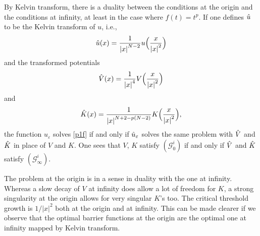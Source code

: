 \documentclass[a4paper]{amsart}
\begin{document}
By Kelvin transform, there is a duality between the conditions at the origin and the conditions at infinity, at least in the case where $f(t)=t^p$. If one defines $\Hat{u}$ to be the Kelvin transform of $u$, i.e., 
\[
 \Hat{u}(x)=\frac{1}{{\left| {x} \right|}^{N-2}} u\Bigl(\frac{x}{{\left| {x} \right|}^2} \Bigr)
\]
and the transformed potentials
\begin{align*}
 \Hat{V}(x)=\frac{1}{{\left| {x} \right|}^4}V\Bigl(\frac{x}{{\left| {x} \right|}^2} \Bigr)
\end{align*}
and
\begin{align*}
 \Hat{K}(x)=\frac{1}{{\left| {x} \right|}^{N+2-p(N-2)}}K\Bigl(\frac{x}{{\left| {x} \right|}^2} \Bigr),
\end{align*}
the function $u_\varepsilon$ solves \eqref{p1f} if and only if $\Hat{u}_\varepsilon$ solves the same problem with $\Hat{V}$ and $\Hat{K}$ in place of $V$ and $K$.
One sees that $V$, $K$ satisfy $(\mathcal{G}_{0}^i)$ if and only if $\Hat{V}$ and $\Hat{K}$  satisfy $(\mathcal{G}_{\infty}^i)$.

 The problem at the origin is in a sense in duality with the one at infinity. Whereas a slow decay of $V$ at infinity
does allow a lot of freedom for $K$, a strong singularity at the origin allows for very singular $K$'s too. The critical
threshold growth is $1/|x|^2$ both at the origin and at infinity. This can be made clearer if we observe that the
optimal barrier functions at the origin are the optimal one at infinity mapped by Kelvin transform.
\end{document}
